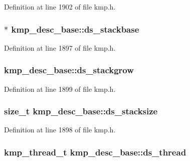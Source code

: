 Definition at line 1902 of file kmp.\-h.

\hypertarget{structkmp__desc__base_a33d81d8dad4336633a06fb03206d74e7}{
\subsubsection[{ds\-\_\-stackbase}]{$\ast$ kmp\-\_\-desc\-\_\-base\-::ds\-\_\-stackbase}}\label{structkmp__desc__base_a33d81d8dad4336633a06fb03206d74e7}


Definition at line 1897 of file kmp.\-h.

\hypertarget{structkmp__desc__base_a803a8f867d5c1a5d675aa03de8b3bc7b}{
\subsubsection[{ds\-\_\-stackgrow}]{ kmp\-\_\-desc\-\_\-base\-::ds\-\_\-stackgrow}}\label{structkmp__desc__base_a803a8f867d5c1a5d675aa03de8b3bc7b}


Definition at line 1899 of file kmp.\-h.

\hypertarget{structkmp__desc__base_a13fc21d4832e63d133b9cc28f4620197}{
\subsubsection[{ds\-\_\-stacksize}]{\setlength{\rightskip}{0pt plus 5cm}size\-\_\-t kmp\-\_\-desc\-\_\-base\-::ds\-\_\-stacksize}}\label{structkmp__desc__base_a13fc21d4832e63d133b9cc28f4620197}


Definition at line 1898 of file kmp.\-h.

\hypertarget{structkmp__desc__base_a870050b7c12984b85171ef1757335bff}{
\subsubsection[{ds\-\_\-thread}]{\setlength{\rightskip}{0pt plus 5cm}kmp\-\_\-thread\-\_\-t kmp\-\_\-desc\-\_\-base\-::ds\-\_\-thread}}\label{structkmp__desc__base_a870050b7c12984b85171ef1757335bff}


